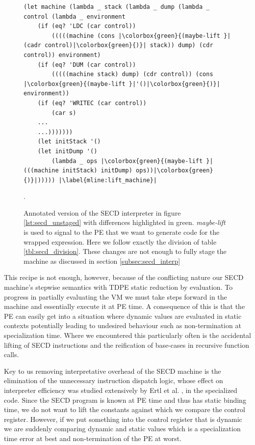 \documentclass[a4paper,12pt,twoside,openright]{report}
\theoremstyle{definition}
\begin{document}
\begin{figure}[ht]
\centering
\begin{verbatim}
(let machine (lambda _ stack (lambda _ dump (lambda _ control (lambda _ environment
    (if (eq? 'LDC (car control))
        (((((machine (cons |\colorbox{green}{(maybe-lift }|(cadr control)|\colorbox{green}{)}| stack)) dump) (cdr control)) environment)
    (if (eq? 'DUM (car control))
        (((((machine stack) dump) (cdr control)) (cons |\colorbox{green}{(maybe-lift }|'()|\colorbox{green}{)}| environment))
    (if (eq? 'WRITEC (car control))
        (car s)
    ...
    ...)))))))
    (let initStack '()
    (let initDump '()
        (lambda _ ops |\colorbox{green}{(maybe-lift }|(((machine initStack) initDump) ops))|\colorbox{green}{)}|))))) |\label{mline:lift_machine}|
\end{verbatim}
\caption{Annotated version of the SECD interpreter in figure \ref{lst:secd_unstaged} with differences highlighted in green. \textit{maybe-lift} is used to signal to the PE that we want to generate code for the wrapped expression. Here we follow exactly the division of table \ref{tbl:secd_division}. These changes are not enough to fully stage the machine as discussed in section \ref{subsec:secd_interp}}.
\label{lst:secd_staged1}
\end{figure}

This recipe is not enough, however, because of the conflicting nature our SECD machine's stepwise semantics with TDPE static reduction by evaluation. To progress in partially evaluating the VM we must take steps forward in the machine and essentially execute it at PE time. A consequence of this is that the PE can easily get into a situation where dynamic values are evaluated in static contexts potentially leading to undesired behaviour such as non-termination at specialization time. Where we encountered this particularly often is the accidental lifting of SECD instructions and the reification of base-cases in recursive function calls.

Key to us removing interpretative overhead of the SECD machine is the elimination of the unnecessary instruction dispatch logic, whose effect on interpreter efficiency was studied extensively by Ertl et al. \cite{ertl2003structure}, in the specialized code. Since the SECD program is known at PE time and thus has static binding time, we do not want to lift the constants against which we compare the control register. However, if we put something into the control register that is dynamic we are suddenly comparing dynamic and static values which is a specialization time error at best and non-termination of the PE at worst.
\end{document}
